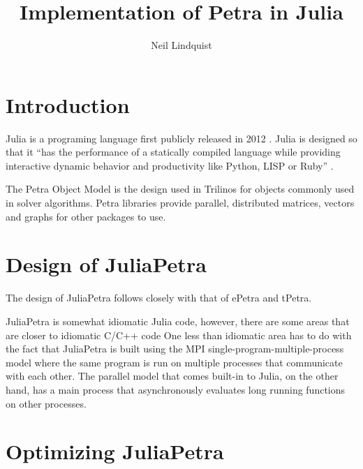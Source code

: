 \documentclass{article}
\title{Implementation of Petra in Julia}
\author{Neil Lindquist}
\begin{document}
\maketitle

\section{Introduction}

Julia is a programing language first publicly released in 2012 \cite{WhyWeCreatedJulia}.
Julia is designed so that it
``has the performance of a statically compiled
language while providing interactive dynamic behavior and productivity like Python, LISP or
Ruby'' \cite{JuliaDesignPaper}.

The Petra Object Model is the design used in Trilinos for objects commonly used in solver algorithms.
\cite{OverviewOfTrilinos}
Petra libraries provide parallel, distributed matrices, vectors and graphs for other packages to use.

\section{Design of JuliaPetra}

The design of JuliaPetra follows closely with that of ePetra and tPetra.


JuliaPetra is somewhat idiomatic Julia code, however, there are some areas that are closer to
idiomatic C/C++ code
One less than idiomatic area has to do with the fact that JuliaPetra is built using the MPI
single-program-multiple-process model where the same program is run on multiple processes
that communicate with each other.
The parallel model that comes built-in to Julia, on the other hand, has a main process that
asynchronously evaluates long running functions on other processes.  \cite{JuliaFreshApproach}


\section{Optimizing JuliaPetra}
\end{document}
